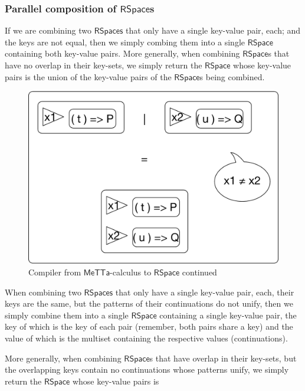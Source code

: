 \subsubsection{Parallel composition of $\mathsf{RSpace}$s}

If we are combining two $\mathsf{RSpaces}$ that only have a single
key-value pair, each; and the keys are not equal, then we simply
combing them into a single $\mathsf{RSpace}$ containing both key-value
pairs. More generally, when combining $\mathsf{RSpace}$s that have no overlap
in their key-sets, we simply return the $\mathsf{RSpace}$ whose
key-value pairs is the union of the key-value pairs of the
$\mathsf{RSpace}$s being combined.\\
 
\begin{figure}
  \centering
  \includegraphics[scale=0.5]{MeTTaCalcImpl2.pdf}
  \caption{Compiler from $\mathsf{MeTTa}$-calculus to $\mathsf{RSpace}$ continued}
\end{figure}

When combining two $\mathsf{RSpaces}$ that only have a single
key-value pair, each, their keys are the same, but the patterns of
their continuations do not unify, then we simply combine them into a
single $\mathsf{RSpace}$ containing a single key-value pair, the key
of which is the key of each pair (remember, both pairs share a key)
and the value of which is the multiset containing the respective
values (continuations).

More generally, when combining $\mathsf{RSpace}$s that have overlap in
their key-sets, but the overlapping keys contain no continuations
whose patterns unify, we simply return the $\mathsf{RSpace}$ whose
key-value pairs is

